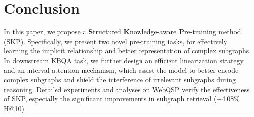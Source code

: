 \documentclass[sigconf,natbib=true,anonymous=False]{acmart}
\begin{document}
\section{Conclusion}
In this paper, we propose a \textbf{S}tructured \textbf{K}nowledge-aware \textbf{P}re-training method (SKP). Specifically, we present two novel pre-training tasks, for effectively learning the implicit relationship and better representation of complex subgraphs. In downstream KBQA task, we further design an efficient linearization strategy and an interval attention mechanism, which assist the model to better encode complex subgraphs and shield the interference of irrelevant subgraphs during reasoning. Detailed experiments and analyses on WebQSP verify the effectiveness of SKP, especially the significant improvements in subgraph retrieval (+4.08\% H@10).











\end{document}
